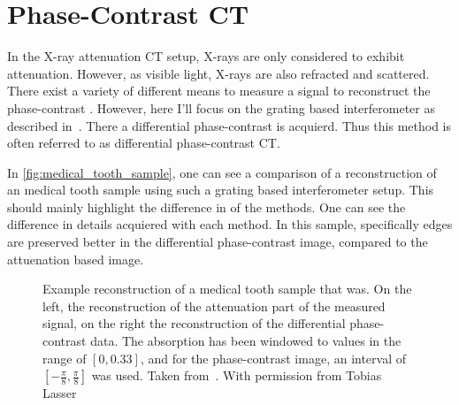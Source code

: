 \section{Phase-Contrast CT}\label{sec:phasecontrast_ct}

In the X-ray attenuation CT setup, X-rays are only considered to exhibit attenuation. However, as
visible light, X-rays are also refracted and scattered. There exist a variety of different means to
measure a signal to reconstruct the phase-contrast . However, here I'll focus on the grating based interferometer as described
in~\cite{pfeiffer_hard-x-ray_2008}. There a differential phase-contrast is acquierd. Thus this
method is often referred to as differential phase-contrast CT\@.

In \autoref{fig:medical_tooth_sample}, one can see a comparison of a reconstruction of an medical
tooth sample using such a grating based interferometer setup. This should mainly highlight the
difference in of the methods. One can see the difference in details acquiered with each method. In
this sample, specifically edges are preserved better in the differential phase-contrast image,
compared to the attuenation based image.

\begin{figure}[H]
	\centering
	\caption{Example reconstruction of a medical tooth sample that was. On the left, the
                reconstruction of the attenuation part of the measured signal, on the right the
                reconstruction of the differential phase-contrast data. The absorption has been
                windowed to values in the range of \([0, 0.33]\), and for the phase-contrast image,
                an interval of \([-\frac{\pi}{8}, \frac{\pi}{8}]\) was used. Taken
                from~\cite{wieczorek_anisotropic_2017}. With permission from Tobias Lasser}
                \label{fig:medical_tooth_sample}
\end{figure}

